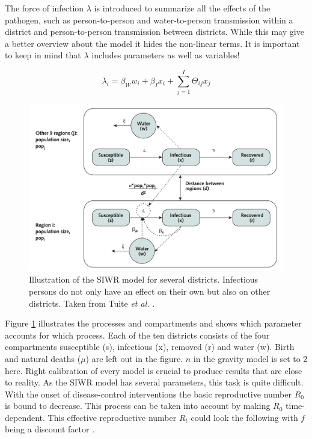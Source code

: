 \documentclass[11pt]{article}
\begin{document}
The force of infection $ \lambda $ is introduced to summarize all the effects of the pathogen, such as person-to-person and water-to-person transmission within a district and person-to-person transmission between districts. While this may give a better overview about the model it hides the non-linear terms. It is important to keep in mind that $ \lambda $ includes parameters as well as variables! 

\begin{center}
\begin{minipage}[t]{0.5\textwidth}

\begin{equation}

\lambda_{i}=\beta_{W}w_{i}+\beta_{I}x_{i}+\sum\limits_{j=1}^I  \Theta_{ij}  x_{j}

\end{equation}
\end{minipage}
\end{center}
\newline



\begin{center}
\begin{figure}
\includegraphics[scale=.9]{Bilder/figure_model_haiti.png}
\caption{Illustration of the SIWR model for several districts. Infectious persons do not only have an effect on their own but also on other districts. Taken from Tuite \textit{et al.} \cite{tuite:2011}.}
\label{pic:model_departments}
\end{figure}
\end{center}


Figure \ref{pic:model_departments} illustrates the processes and compartments and shows which parameter accounts for which process. Each of the ten districts consists of the four compartments susceptible (s), infectious (x), removed (r) and water (w). Birth and natural deaths ($ \mu $) are left out in the figure. $ n $ in the gravity model is set to 2 here. Right calibration of every model is crucial to produce results that are close to reality. As the SIWR model has several parameters, this task is quite difficult. With the onset of disease-control interventions the basic reproductive number $ R_{0} $ is bound to decrease. This process can be taken into account by making $ R_{0} $ time-dependent. This effective reproductive number $ R_{t} $ could look the following with $ f $ being a discount factor \cite{tuite:2011}.
\end{document}
